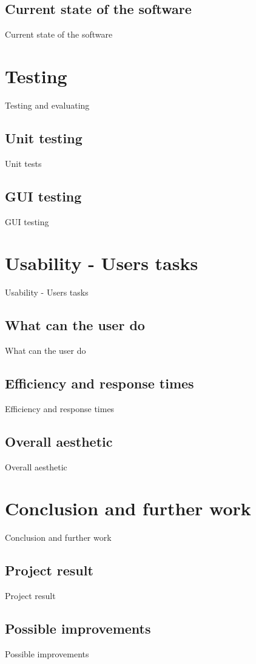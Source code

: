 \documentclass[12pt]{report}
\begin{document}
\chapter{Current state of the software}
Current state of the software

\part{Testing}
Testing and evaluating

\chapter{Unit testing}
Unit tests

\chapter{GUI testing}
GUI testing

\part{Usability - Users tasks}
Usability - Users tasks

\chapter{What can the user do}
What can the user do


\chapter{Efficiency and response times}
Efficiency and response times

\chapter{Overall aesthetic}
Overall aesthetic

\part{Conclusion and further work}
Conclusion and further work

\chapter{Project result}
Project result

\chapter{Possible improvements}
Possible improvements
\end{document}
